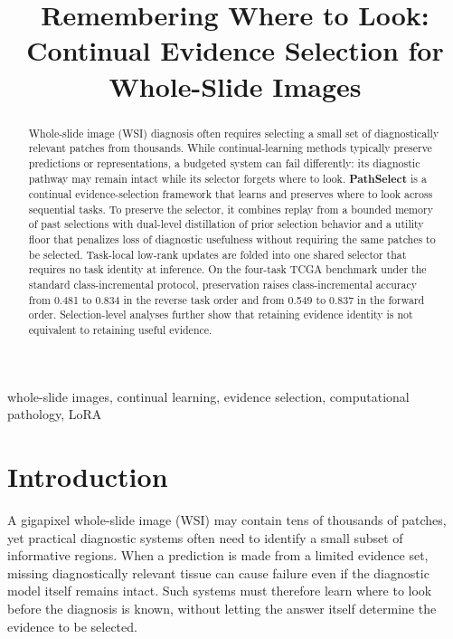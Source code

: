 \documentclass{article}
\title{Remembering Where to Look: Continual Evidence Selection for Whole-Slide Images}
\begin{document}
\ninept
\maketitle

\begin{abstract}
Whole-slide image (WSI) diagnosis often requires selecting a small set of diagnostically relevant patches from thousands. While continual-learning methods typically preserve predictions or representations, a budgeted system can fail differently: its diagnostic pathway may remain intact while its selector forgets where to look. \textbf{PathSelect} is a continual evidence-selection framework that learns and preserves where to look across sequential tasks. To preserve the selector, it combines replay from a bounded memory of past selections with dual-level distillation of prior selection behavior and a utility floor that penalizes loss of diagnostic usefulness without requiring the same patches to be selected. Task-local low-rank updates are folded into one shared selector that requires no task identity at inference. On the four-task TCGA benchmark under the standard class-incremental protocol, preservation raises class-incremental accuracy from 0.481 to 0.834 in the reverse task order and from 0.549 to 0.837 in the forward order. Selection-level analyses further show that retaining evidence identity is not equivalent to retaining useful evidence.
\end{abstract}

\begin{keywords}
whole-slide images, continual learning, evidence selection, computational pathology, LoRA
\end{keywords}

\section{Introduction}
\label{sec:intro}

A gigapixel whole-slide image (WSI) may contain tens of thousands of patches, yet practical diagnostic systems often need to identify a small subset of informative regions. When a prediction is made from a limited evidence set, missing diagnostically relevant tissue can cause failure even if the diagnostic model itself remains intact. Such systems must therefore learn where to look before the diagnosis is known, without letting the answer itself determine the evidence to be selected.
\end{document}
